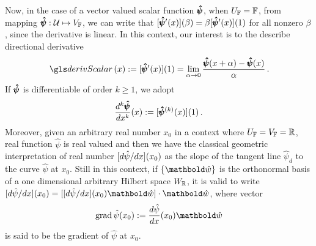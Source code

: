 Now, in the case of a vector valued scalar function $\pmb{\hat{\psi}}$, when $U_{\mathbb{F}}=\mathbb{F}$, from mapping $\pmb{\hat{\psi}} : \mathcal{U} \mapsto V_{\mathbb{F}}$, we can write that $[\pmb{\hat{\psi}}'(x)](\beta) = \beta[\pmb{\hat{\psi}}'(x)](1)$ for all nonzero $\beta$, since the derivative is linear. In this context, our interest is to the describe directional derivative  
\begin{equation}\label{eq:derivVecScaFun}
\fua{\gloref{derivScalar}}{x} := \fua{[\tnr{\hat{\psi}}'(x)]}{1} = \lim_{\alpha\to 0} \dfrac{\fua{\tnr{\hat{\psi}}}{x+\alpha}-\fua{\tnr{\hat{\psi}}}{x}}{\alpha}\,. 
\end{equation} 
If $\pmb{\hat{\psi}}$ is differentiable of order $k\geqslant 1$, we adopt  
\begin{equation}
\dfrac{d^k\pmb{\hat{\psi}}}{dx^k}(x):=[\pmb{\hat{\psi}}^{(k)}(x)](1)\,.
\end{equation} 
Moreover, given an arbitrary real number $x_0$ in a context where $U_{\mathbb{F}}=V_{\mathbb{F}}=\mathbb{R}$, real function $\hat{\psi}$ is real valued and then we have the classical geometric interpretation of real number $[d{\hat{\psi}}/dx](x_0)$ as the slope of the tangent line ${\hat{\psi}}_\mathit{d}$ to the curve ${\hat{\psi}}$ at $x_0$. Still in this context, if $\{\vun{w}\}$ is the orthonormal basis of a one dimensional arbitrary Hilbert space $W_{\mathbb{R}}$, it is valid to write
$\fua{[d{\hat{\psi}}/dx]}{x_0}=[\fua{[d{\hat{\psi}}/dx]}{x_0}\vun{w}]\cdot\vun{w}$, where vector 
\begin{equation}
\grad{\fua{{\hat{\psi}}}{x_0}}:=\fua{\dfrac{d{\hat{\psi}}}{dx}}{x_0}\vun{w}
\end{equation}
is said to be the gradient of ${\hat{\psi}}$ at $x_0$. 

